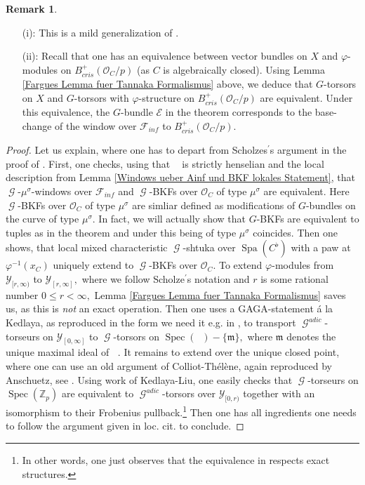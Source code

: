 \documentclass[a4paper,10,5 pt]{amsart}
\theoremstyle{definition}
\newtheorem{Remark}{Remark}
\DeclareMathOperator{\Spec}{Spec}
\DeclareMathOperator{\Spa}{Spa}
\DeclareMathOperator{\Ainf}{\mathbb{A}_{inf}}
\DeclareMathOperator{\G}{\mathcal{G}}
\begin{document}
\begin{Remark}\label{Bemerkung zum zweiten Buendel in den Modifikationen}
\begin{enumerate}
\item[(i):] This is a mild generalization of \cite[Theorem 14.1.1.]{Berkeley lectures}.
\item[(ii):] Recall that one has an equivalence between vector bundles on $X$ and $\varphi$-modules on $B_{cris}^{+}(\mathcal{O}_{C}/p)$ (as $C$ is algebraically closed). Using Lemma \ref{Fargues Lemma fuer Tannaka Formalismus} above, we deduce that $G$-torsors on $X$ and $G$-torsors with $\varphi$-structure on $B_{cris}^{+}(\mathcal{O}_{C}/p)$ are equivalent. Under this equivalence, the $G$-bundle $\mathcal{E}$ in the theorem corresponds to the base-change of the window over $\mathcal{F}_{inf}$ to $B_{cris}^{+}(\mathcal{O}_{C}/p).$
\end{enumerate}
\end{Remark}
\begin{proof}
Let us explain, where one has to depart from Scholzes$^{\prime}$s argument in the proof of \cite[Theorem 14.1.1.]{Berkeley lectures}. First, one checks, using that $\Ainf$ is strictly henselian and the local description from Lemma \ref{Windows ueber Ainf und BKF lokales Statement}, that $\G$-$\mu^{\sigma}$-windows over $\mathcal{F}_{inf}$ and $\G$-BKFs over $\mathcal{O}_{C}$ of type $\mu^{\sigma}$ are equivalent. Here $\G$-BKFs over $\mathcal{O}_{C}$ of type $\mu^{\sigma}$ are simliar defined as modifications of $G$-bundles on the curve of type $\mu^{\sigma}.$ In fact, we will actually show that $G$-BKFs are equivalent to tuples as in the theorem and under this being of type $\mu^{\sigma}$ coincides. Then one shows, that local mixed characteristic $\G$-shtuka over $\Spa(C^{\flat})$ with a paw at $\varphi^{-1}(x_{C})$ uniquely extend to $\G$-BKFs over $\mathcal{O}_{C}.$ To extend $\varphi$-modules from $\mathcal{Y}_{[r,\infty)}$ to $\mathcal{Y}_{[r,\infty]},$ where we follow Scholze$^{\prime}$s notation and $r$ is some rational number $0\leq r < \infty,$ Lemma \ref{Fargues Lemma fuer Tannaka Formalismus} saves us, as this is \textit{not} an exact operation. Then one uses a GAGA-statement á la Kedlaya, as reproduced in the form we need it e.g. in \cite[Prop. 5.3.]{Anschuetz}, to transport $\G^{adic}$-torseurs on $\mathcal{Y}_{[0,\infty]}$ to $\G$-torsors on $\Spec(\Ainf)-\lbrace \mathfrak{m} \rbrace,$ where $\mathfrak{m}$ denotes the unique maximal ideal of $\Ainf.$ It remains to extend over the unique closed point, where one can use an old argument of Colliot-Thélène, again reproduced by Anschuetz, see \cite[Prop. 6.5.]{Anschuetz}. Using work of Kedlaya-Liu, one easily checks that $\G$-torseurs on $\Spec(\mathbb{Z}_{p})$ are equivalent to $\G^{adic}$-torsors over $\mathcal{Y}_{[0,r)}$ together with an isomorphism to their Frobenius pullback.\footnote{In other words, one just observes that the equivalence in \cite[Prop. 12.3.5.]{Berkeley lectures} respects exact structures.} Then one has all ingredients one needs to follow the argument given in loc. cit. to conclude.
\end{proof}
\end{document}

